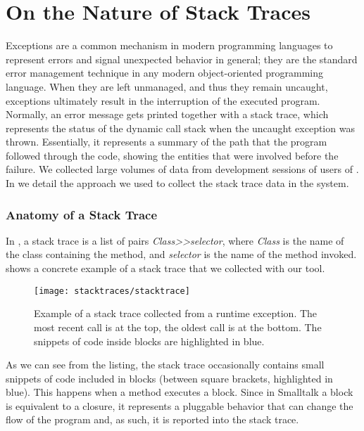 \section{On the Nature of Stack Traces} \label{sec:stacktraces-nature}

Exceptions are a common mechanism in modern programming languages to represent errors and signal unexpected behavior in general; they are the standard error management technique in any modern object-oriented programming language.
When they are left unmanaged, and thus they remain uncaught, exceptions ultimately result in the interruption of the executed program.
Normally, an error message gets printed together with a stack trace, which represents the status of the dynamic call stack when the uncaught exception was thrown.
Essentially, it represents a summary of the path that the program followed through the code, showing the entities that were involved before the failure.
We collected large volumes of data from development sessions of users of \pha.
In  we detail the approach we used to collect the stack trace data in the \pha system.


\subsubsection{Anatomy of a Stack Trace}

In \pha, a stack trace is a list of pairs \textit{Class{>}{>}selector}, where \textit{Class} is the name of the class containing the method, and \textit{selector} is the name of the method invoked.
 shows a concrete example of a stack trace that we collected with our tool.

\begin{figure}[ht]
\begin{center}
  \texttt{[image: stacktraces/stacktrace]}
  \caption{Example of a stack trace collected from a runtime exception.
The most recent call is at the top, the oldest call is at the bottom.
The snippets of code inside blocks are highlighted in blue.}
  \label{fig:stacktrace}
\end{center}
\end{figure}

As we can see from the listing, the stack trace occasionally contains small snippets of code included in blocks (between square brackets, highlighted in blue).
This happens when a method executes a block.
Since in Smalltalk a block is equivalent to a closure, it represents a pluggable behavior that can change the flow of the program and, as such, it is reported into the stack trace.

